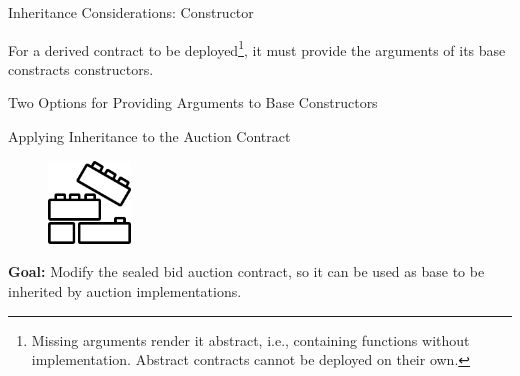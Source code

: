 \documentclass[handout]{beamer}
\begin{document}
\begin{frame}{Inheritance Considerations: Constructor}

For a derived contract to be deployed\footnote{Missing arguments render it abstract, i.e., containing functions without implementation. Abstract contracts cannot be deployed on their own.}, it must provide the arguments of its base constracts constructors.

\vspace{-0.5em}

\begin{samplecode}{Two Options for Providing Arguments to Base Constructors}
	
\end{samplecode}


\end{frame}


\begin{frame}{Applying Inheritance to the Auction Contract}

\begin{minipage}{0.3\textwidth}
	\begin{figure}
		\center
		\includegraphics[width= 2.2cm]{../assets/images/construction.png}	
	\end{figure}
\end{minipage}
\begin{minipage}{0.65\textwidth}
	\textbf{Goal:} Modify the sealed bid auction contract, so it can be used as base to be inherited by auction implementations.\\
\end{minipage}

\vspace{3em}


\end{frame}
\end{document}
